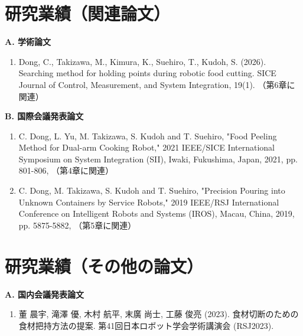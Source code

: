 \chapter*{研究業績（関連論文）}

\noindent\textbf{A. 学術論文}

\begin{enumerate}[
  label=\arabic*).,
  leftmargin=3em,
  itemsep=0.8\baselineskip
]
  \item Dong, C., Takizawa, M., Kimura, K., Suehiro, T., Kudoh, S. (2026). Searching method for holding points during robotic food cutting. SICE Journal of Control, Measurement, and System Integration, 19(1). 
  （第6章に関連）
\end{enumerate}

\vspace{1\baselineskip}
\noindent\textbf{B. 国際会議発表論文}

\begin{enumerate}[
  label=\arabic*).,
  leftmargin=3em,
  itemsep=0.8\baselineskip,
  resume
]
  \item C. Dong, L. Yu, M. Takizawa, S. Kudoh and T. Suehiro, "Food Peeling Method for Dual-arm Cooking Robot," 2021 IEEE/SICE International Symposium on System Integration (SII), Iwaki, Fukushima, Japan, 2021, pp. 801-806,
  （第4章に関連）

  \item C. Dong, M. Takizawa, S. Kudoh and T. Suehiro, "Precision Pouring into Unknown Containers by Service Robots," 2019 IEEE/RSJ International Conference on Intelligent Robots and Systems (IROS), Macau, China, 2019, pp. 5875-5882,
  （第5章に関連）
\end{enumerate}




\chapter*{研究業績（その他の論文）}
\vspace{1\baselineskip}
\noindent\textbf{A. 国内会議発表論文}

\begin{enumerate}[
  label=\arabic*).,
  leftmargin=3em,
  itemsep=0.8\baselineskip
]
  \item 董 晨宇, 滝澤 優, 木村 航平, 末廣 尚士, 工藤 俊亮 (2023). 食材切断のための食材把持方法の提案. 第41回日本ロボット学会学術講演会 (RSJ2023).
\end{enumerate}